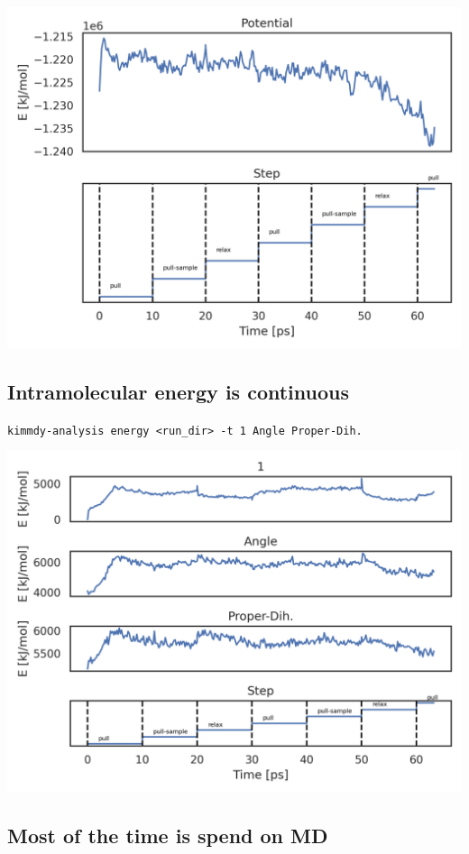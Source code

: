 \documentclass[
  letterpaper,
  DIV=11,
  numbers=noendperiod]{scrartcl}
\begin{document}
\includegraphics{www/tripelhelix_potential.png}

\hypertarget{intramolecular-energy-is-continuous}{%
\subsection{Intramolecular energy is
continuous}\label{intramolecular-energy-is-continuous}}

\texttt{kimmdy-analysis\ energy\ \textless{}run\_dir\textgreater{}\ -t\ 1\ Angle\ Proper-Dih.}

\includegraphics{www/tripelhelix_bonded.png}

\hypertarget{most-of-the-time-is-spend-on-md}{%
\subsection{Most of the time is spend on
MD}\label{most-of-the-time-is-spend-on-md}}
\end{document}
